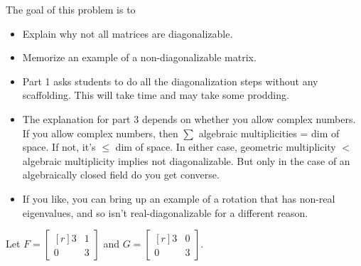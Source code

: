 \documentclass{problemset}
\newcommand{\mat}[1]{\begin{bmatrix*}[r]#1\end{bmatrix*}}
\begin{document}
	\question
	\begin{annotation}
		\begin{goals}

			The goal of this problem is to
			\begin{itemize}
				\item Explain why not all matrices are diagonalizable.
				\item Memorize an example of a non-diagonalizable matrix.
			\end{itemize}
		\end{goals}

		\begin{notes}
			\begin{itemize}
				\item Part 1 asks students to do all the diagonalization steps
					without any scaffolding. This will take time and may take
					some prodding.
				\item The explanation for part 3 depends on whether you allow complex numbers.
					If you allow complex numbers, then $\sum$ algebraic multiplicities = dim
					of space. If not, it's $\leq$ dim of space. In either case, geometric
					multiplicity $<$ algebraic multiplicity implies not diagonalizable. 
					But only in the case of an algebraically closed field do you get
					converse.
				\item If you like, you can bring up an example of a rotation that has non-real
					eigenvalues, and so isn't real-diagonalizable for a different reason.
			\end{itemize}
		\end{notes}
	\end{annotation}
	Let $F=\mat{3&1\\0&3}$ and $G=\mat{3&0\\0&3}$.
\end{document}
